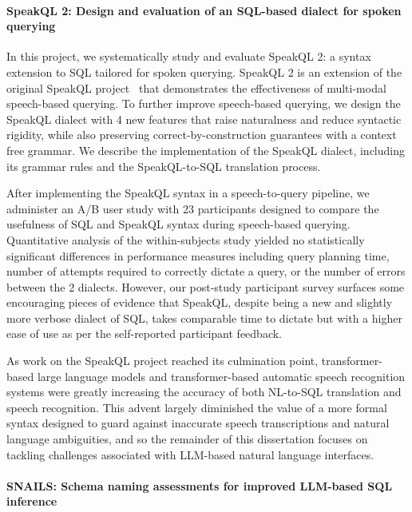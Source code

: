 \paragraph{\textbf{SpeakQL 2: Design and evaluation of an SQL-based dialect for spoken querying}}

In this project, we systematically study and evaluate SpeakQL 2: a syntax extension to SQL tailored for spoken querying.
SpeakQL 2 is an extension of the original SpeakQL project~\cite{Shah2020} that demonstrates the effectiveness of multi-modal speech-based querying.
To further improve speech-based querying, we design the SpeakQL dialect with 4 new features that raise naturalness and reduce syntactic rigidity, while also preserving correct-by-construction guarantees with a context free grammar.
We describe the implementation of the SpeakQL dialect, including its grammar rules and the SpeakQL-to-SQL translation process.

After implementing the SpeakQL syntax in a speech-to-query pipeline, we administer an A/B user study with 23 participants designed to compare the usefulness of SQL and SpeakQL syntax during speech-based querying.
Quantitative analysis of the within-subjects study yielded no statistically significant differences in performance measures including query planning time, number of attempts required to correctly dictate a query, or the number of errors between the 2 dialects.
However, our post-study participant survey surfaces some encouraging pieces of evidence that SpeakQL, despite being a new and slightly more verbose dialect of SQL, takes comparable time to dictate but with a higher ease of use as per the self-reported participant feedback.

As work on the SpeakQL project reached its culmination point, transformer-based large language models and transformer-based automatic speech recognition systems were greatly increasing the accuracy of both NL-to-SQL translation and speech recognition.
This advent largely diminished the value of a more formal syntax designed to guard against inaccurate speech transcriptions and natural language ambiguities, and so the remainder of this dissertation focuses on tackling challenges associated with LLM-based natural language interfaces.

\paragraph{\textbf{SNAILS: Schema naming assessments for improved LLM-based SQL inference}}

